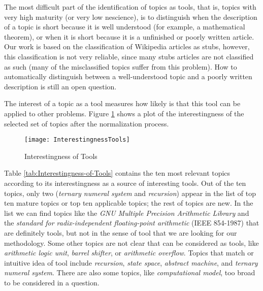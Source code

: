 The most difficult part of the identification of topics as tools,
that is, topics with very high maturity (or very low nescience), is
to distinguish when the description of a topic is short because it
is well understood (for example, a mathematical theorem), or when
it is short because it is a unfinished or poorly written article.
Our work is based on the classification of Wikipedia articles as stubs,
however, this classification is not very reliable, since many stubs
articles are not classified as such (many of the misclassified topics
suffer from this problem). How to automatically distinguish between
a well-understood topic and a poorly written description is still
an open question.

The interest of a topic as a tool measures how likely is that this
tool can be applied to other problems. Figure \ref{fig:Interestingness-of-Tools}
shows a plot of the interestingness of the selected set of topics
after the normalization process.

\begin{figure}[h]
\centering\texttt{[image: InterestingnessTools]}
\caption{\label{fig:Interestingness-of-Tools}Interestingness of Tools}
\end{figure}

Table \ref{tab:Interestingness-of-Tools} contains the ten most relevant
topics according to its interestingness as a source of interesting
tools. Out of the ten topics, only two (\emph{ternary numeral system}
and \emph{recursion}) appear in the list of top ten mature topics
or top ten applicable topics; the rest of topics are new. In the list
we can find topics like the \emph{GNU Multiple Precision Arithmetic
Library} and the \emph{standard for radix-independent floating-point
arithmetic} (IEEE 854-1987) that are definitely tools, but not in
the sense of tool that we are looking for our methodology. Some other
topics are not clear that can be considered as tools, like \emph{arithmetic
logic unit}, \emph{barrel shifter}, or \emph{arithmetic overflow}.
Topics that match or intuitive idea of tool include \emph{recursion},
\emph{state space}, \emph{abstract machine}, and \emph{ternary numeral
system}. There are also some topics, like \emph{computational model},
too broad to be considered in a question.

